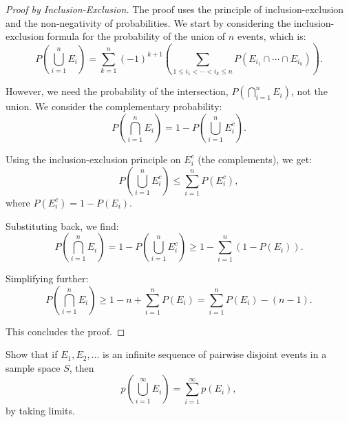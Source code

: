         \begin{proof}[Proof by Inclusion-Exclusion]
            The proof uses the principle of inclusion-exclusion and the non-negativity of probabilities. We start by considering the inclusion-exclusion formula for the probability of the union of \( n \) events, which is:
            \[
            P\left(\bigcup_{i=1}^n E_i\right) = \sum_{k=1}^n (-1)^{k+1} \left(\sum_{1 \leq i_1 < \cdots < i_k \leq n} P(E_{i_1} \cap \cdots \cap E_{i_k})\right).
            \]
            
            However, we need the probability of the intersection, \( P\left(\bigcap_{i=1}^n E_i\right) \), not the union. We consider the complementary probability:
            \[
            P\left(\bigcap_{i=1}^n E_i\right) = 1 - P\left(\bigcup_{i=1}^n E_i^c\right).
            \]
            
            Using the inclusion-exclusion principle on \( E_i^c \) (the complements), we get:
            \[
            P\left(\bigcup_{i=1}^n E_i^c\right) \leq \sum_{i=1}^n P(E_i^c),
            \]
            where \( P(E_i^c) = 1 - P(E_i) \).
            
            Substituting back, we find:
            \[
            P\left(\bigcap_{i=1}^n E_i\right) = 1 - P\left(\bigcup_{i=1}^n E_i^c\right) \geq 1 - \sum_{i=1}^n (1 - P(E_i)).
            \]
            
            Simplifying further:
            \[
            P\left(\bigcap_{i=1}^n E_i\right) \geq 1 - n + \sum_{i=1}^n P(E_i) = \sum_{i=1}^n P(E_i) - (n - 1).
            \]
            
            This concludes the proof.
            \end{proof}
        \begin{exercise}
            Show that if \(E_1, E_2, \ldots\) is an infinite sequence of pairwise disjoint events in a sample space \(S\), then 
            \[
                p\left(\bigcup_{i=1}^\infty E_i\right) = \sum_{i=1}^\infty p(E_i),
            \]
            by taking limits.
        \end{exercise}
        
